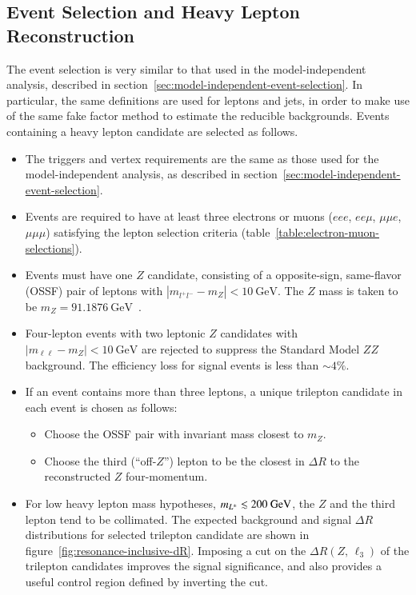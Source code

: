 \subsection{Event Selection and Heavy Lepton Reconstruction}\label{sec:event-3l-selection}
The event selection is very similar to that used in the model-independent analysis, described in section~\ref{sec:model-independent-event-selection}. In particular, the same definitions are used for leptons and jets, in order to make use of the same fake factor method to estimate the reducible backgrounds. Events containing a heavy lepton candidate are selected as follows.

\begin{itemize}
	\item The triggers and vertex requirements are the same as those used for the model-independent analysis, as described in section~\ref{sec:model-independent-event-selection}. 
	\item Events are required to have at least three electrons or muons ($eee$, $ee\mu$, $\mu\mu e$, $\mu\mu\mu$) satisfying the lepton selection criteria (table~\ref{table:electron-muon-selections}). 
	\item Events must have one $Z$ candidate, consisting of a opposite-sign, same-flavor (OSSF) pair of leptons with $|m_{l^+l^-}-m_{Z}|<10~\mbox{GeV}$. The $Z$ mass is taken to be $m_Z=91.1876~\mbox{GeV}$~\cite{pdg}. 
	\item Four-lepton events with two leptonic $Z$ candidates with $|m_{\ell\ell}-m_Z|<\SI{10}{\giga\electronvolt}$ are rejected to suppress the Standard Model $ZZ$ background. The efficiency loss for signal events is less than $\sim4\%$. 
	\item If an event contains more than three leptons, a unique trilepton candidate in each event is chosen as follows:
	\begin{itemize}
		\item Choose the OSSF pair with invariant mass closest to $m_{Z}$.
		\item Choose the third (``off-$Z$'') lepton to be the closest in $\Delta R$ to the reconstructed $Z$ four-momentum.
	\end{itemize}
	\item For low heavy lepton mass hypotheses, $m_{L^{\pm}}\lesssim 200~\mbox{GeV}$, the $Z$ and the third lepton tend to be collimated. The expected background and signal $\Delta R$ distributions for selected trilepton candidate are shown in figure~\ref{fig:resonance-inclusive-dR}. Imposing a cut on the $\Delta R(Z,\,\ell_3)$ of the trilepton candidates improves the signal significance, and also provides a useful control region defined by inverting the cut. 


\end{itemize}
